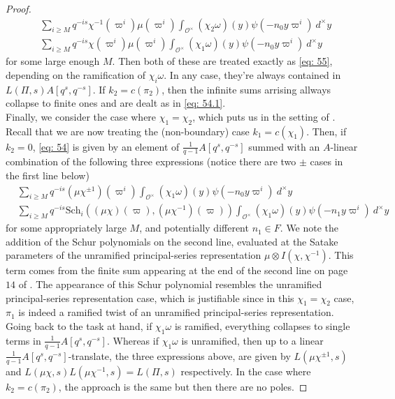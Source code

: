 \documentclass{amsart}
\theoremstyle{plain}
\theoremstyle{plain}
\theoremstyle{remark}
\begin{document}
\begin{proof}
\begin{align*}
    &\sum_{i\geq M}q^{-is}\chi^{-1}(\varpi^i)\mu(\varpi^i)\int_{\mathcal{O}^\times}(\chi_2\omega)(y)\psi(-n_0y\varpi^i)\ d^\times y\\
    &\sum_{i\geq M}q^{-is}\chi(\varpi^i)\mu(\varpi^i)\int_{\mathcal{O}^\times}(\chi_1\omega)(y)\psi(-n_0y\varpi^i)\ d^\times y
\end{align*}
for some large enough $M$.
Then both of these are treated exactly as \eqref{eq: 55}, depending on the ramification of $\chi_i\omega$. In any case, they're always contained in $L(\Pi,s)A[q^s,q^{-s}]$. If $k_2=c(\pi_2)$, then the infinite sums arrising allways collapse to finite ones and are dealt as in \eqref{eq: 54.1}.\\
Finally, we consider the case where $\chi_1=\chi_2$, which puts us in the setting of \cite[Lemma $3.5$]{Assing_2018}. Recall that we are now treating the (non-boundary) case $k_1=c(\chi_1)$. Then, if $k_2=0$, \eqref{eq: 54} is given by an element of $\tfrac{1}{q-1}A[q^s,q^{-s}]$ summed with an $A$-linear combination of the following three expressions (notice there are two $\pm$ cases in the first line below)
\begin{align*}
    &\sum_{i\geq M}q^{-is}(\mu\chi^{\pm 1})(\varpi^i)\int_{\mathcal{O}^\times}(\chi_1\omega)(y)\psi(-n_0y\varpi^i)\ d^\times y\\
    &\sum_{i\geq M}q^{-is}\mathrm{Sch}_{i}\left((\mu\chi)(\varpi),(\mu\chi^{-1})(\varpi)\right)\int_{\mathcal{O}^\times}(\chi_1\omega)(y)\psi(-n_1y\varpi^i)\ d^\times y
\end{align*}
for some appropriately large $M$, and potentially different $n_1\in F$. We note the addition of the Schur polynomials on the second line, evaluated at the Satake parameters of the unramified principal-series representation $\mu\otimes I(\chi,\chi^{-1})$. This term comes from the finite sum appearing at the end of the second line on page $14$ of 
\cite{Assing_2018}. The appearance of this Schur polynomial resembles the unramified principal-series representation case, which is justifiable since in this $\chi_1=\chi_2$ case, $\pi_1$ is indeed a ramified twist of an unramified principal-series representation. Going back to the task at hand, if $\chi_1\omega$ is ramified, everything collapses to single terms in $\tfrac{1}{q-1}A[q^s,q^{-s}]$. Whereas if $\chi_1\omega$ is unramified, then up to a linear $\tfrac{1}{q-1}A[q^s,q^{-s}]$-translate, the three expressions above, are given by $L(\mu\chi^{\pm1},s)$ and $L(\mu\chi,s)L(\mu\chi^{-1},s)=L(\Pi,s)$ respectively. In the case where $k_2=c(\pi_2)$, the approach is the same but then there are no poles.
\end{proof}
\end{document}

